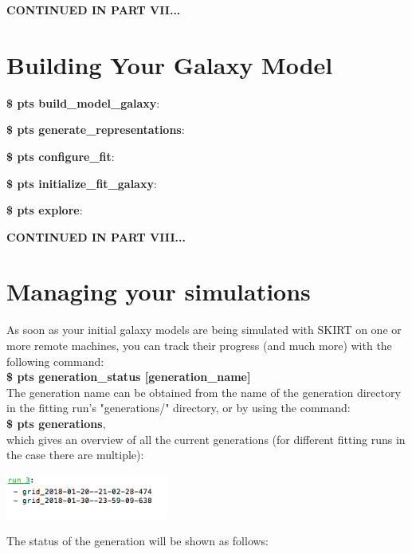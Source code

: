 \documentclass[15pt,a4paper,oneside,openright]{report}
\begin{document}
\begin{center}
\textbf{CONTINUED IN PART VII...}
\end{center}

\part{Building Your Galaxy Model}

\textbf{\$ pts build\_model\_galaxy}:

\textbf{\$ pts generate\_representations}:

\textbf{\$ pts configure\_fit}:

\textbf{\$ pts initialize\_fit\_galaxy}:

\textbf{\$ pts explore}:

\begin{center}
\textbf{CONTINUED IN PART VIII...}
\end{center}

\part{Managing your simulations}

As soon as your initial galaxy models are being simulated with SKIRT on one or more remote machines, you can track their progress (and much more) with the following command:\\

\textbf{\$ pts generation\_status [generation\_name]}\\

The generation name can be obtained from the name of the generation directory in the fitting run's "generations/" directory, or by using the command:\\

\textbf{\$ pts generations},\\

which gives an overview of all the current generations (for different fitting runs in the case there are multiple):

\begin{center}
\includegraphics[width=0.4\textwidth]{figures/generations.png}
\end{center}

The status of the generation will be shown as follows:
\end{document}
